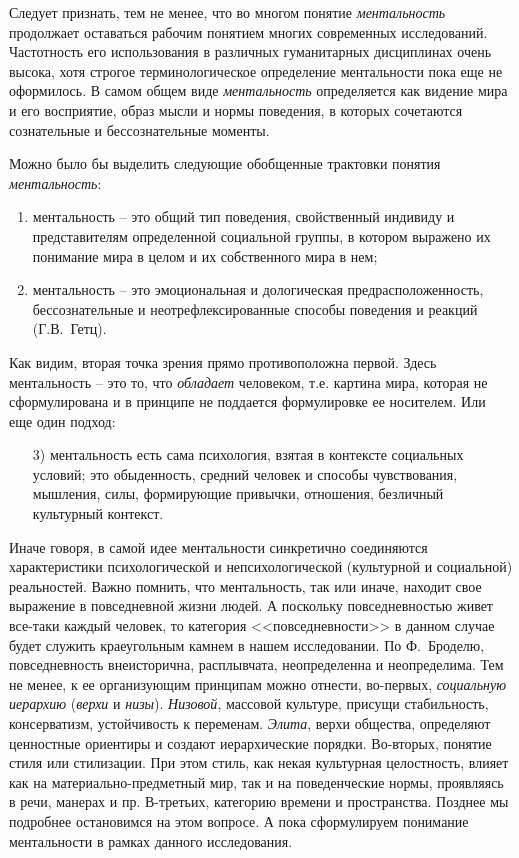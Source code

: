 Следует признать, тем не менее, что во многом понятие \emph{ментальность} продолжает
оставаться рабочим понятием многих современных исследований. Частотность его использования
в различных гуманитарных дисциплинах очень высока, хотя строгое терминологическое определение
ментальности пока еще не оформилось. В самом общем виде \emph{ментальность} определяется как
видение мира и его восприятие, образ мысли и нормы поведения, в которых сочетаются
сознательные и бессознательные моменты.

Можно было бы выделить следующие обобщенные трактовки понятия \emph{ментальность}:
\begin{enumerate}[label={\arabic*)}]
    \item ментальность -- это общий тип поведения, свойственный индивиду и представителям
    определенной социальной группы, в котором выражено их понимание мира в целом и
    их собственного мира в нем;
    \item ментальность -- это эмоциональная и дологическая предрасположенность,
    бессознательные и неотрефлексированные способы поведения и реакций (Г.В.~Гетц).
\end{enumerate}

Как видим, вторая точка зрения прямо противоположна первой. Здесь ментальность -- это то,
что \emph{обладает} человеком, т.е. картина мира, которая не сформулирована и в принципе не
поддается формулировке ее носителем. Или еще один подход:
\begin{enumerate}
    \item[3)] ментальность есть сама психология, взятая в контексте социальных условий; это обыденность,
    средний человек и способы чувствования, мышления, силы, формирующие привычки, отношения,
    безличный культурный контекст.~\autocite{online:kulturolog}
\end{enumerate}

Иначе говоря, в самой идее ментальности синкретично соединяются характеристики психологической и
непсихологической (культурной и социальной) реальностей. Важно помнить, что ментальность,
так или иначе, находит свое выражение в повседневной жизни людей. А поскольку повседневностью живет
все-таки каждый человек, то категория <<повседневности>> в данном случае будет служить краеугольным
камнем в нашем исследовании. По Ф.~Броделю, повседневность внеисторична, расплывчата, неопределенна
и неопределима. Тем не менее, к ее организующим принципам можно отнести, во-первых, \emph{социальную иерархию}
(\emph{верхи} и \emph{низы}). \emph{Низовой}, массовой культуре, присущи стабильность,
консерватизм, устойчивость к переменам. \emph{Элита}, верхи общества, определяют
ценностные ориентиры и создают иерархические порядки. Во-вторых, понятие стиля или стилизации.
При этом стиль, как некая культурная целостность, влияет как на материально-предметный мир,
так и на поведенческие нормы, проявляясь в речи, манерах и пр. В-третьих, категорию времени и
пространства. Позднее мы подробнее остановимся на этом вопросе. А пока сформулируем понимание
ментальности в рамках данного исследования.


